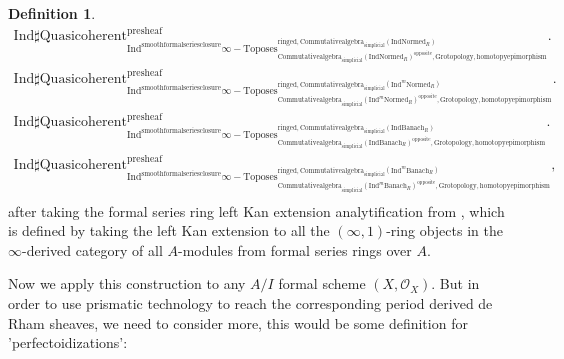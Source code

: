 \documentclass[11pt]{book}
\theoremstyle{definition}
\newtheorem{definition}[theorem]{Definition}
\numberwithin{equation}{section}
\begin{document}
\begin{definition}
\begin{align}
\mathrm{Ind}\mathrm{\sharp Quasicoherent}^{\text{presheaf}}_{\mathrm{Ind}^\text{smoothformalseriesclosure}\infty-\mathrm{Toposes}^{\mathrm{ringed},\mathrm{Commutativealgebra}_{\mathrm{simplicial}}(\mathrm{Ind}\mathrm{Normed}_R)}_{\mathrm{Commutativealgebra}_{\mathrm{simplicial}}(\mathrm{Ind}\mathrm{Normed}_R)^\mathrm{opposite},\mathrm{Grotopology,homotopyepimorphism}}}.\\
\mathrm{Ind}\mathrm{\sharp Quasicoherent}^{\text{presheaf}}_{\mathrm{Ind}^\text{smoothformalseriesclosure}\infty-\mathrm{Toposes}^{\mathrm{ringed},\mathrm{Commutativealgebra}_{\mathrm{simplicial}}(\mathrm{Ind}^m\mathrm{Normed}_R)}_{\mathrm{Commutativealgebra}_{\mathrm{simplicial}}(\mathrm{Ind}^m\mathrm{Normed}_R)^\mathrm{opposite},\mathrm{Grotopology,homotopyepimorphism}}}.\\
\mathrm{Ind}\mathrm{\sharp Quasicoherent}^{\text{presheaf}}_{\mathrm{Ind}^\text{smoothformalseriesclosure}\infty-\mathrm{Toposes}^{\mathrm{ringed},\mathrm{Commutativealgebra}_{\mathrm{simplicial}}(\mathrm{Ind}\mathrm{Banach}_R)}_{\mathrm{Commutativealgebra}_{\mathrm{simplicial}}(\mathrm{Ind}\mathrm{Banach}_R)^\mathrm{opposite},\mathrm{Grotopology,homotopyepimorphism}}}.\\
\mathrm{Ind}\mathrm{\sharp Quasicoherent}^{\text{presheaf}}_{\mathrm{Ind}^\text{smoothformalseriesclosure}\infty-\mathrm{Toposes}^{\mathrm{ringed},\mathrm{Commutativealgebra}_{\mathrm{simplicial}}(\mathrm{Ind}^m\mathrm{Banach}_R)}_{\mathrm{Commutativealgebra}_{\mathrm{simplicial}}(\mathrm{Ind}^m\mathrm{Banach}_R)^\mathrm{opposite},\mathrm{Grotopology,homotopyepimorphism}}},\\ 
\end{align}
after taking the formal series ring left Kan extension analytification from \cite[Section 4.2]{BBM}, which is defined by taking the left Kan extension to all the $(\infty,1)$-ring objects in the $\infty$-derived category of all $A$-modules from formal series rings over $A$.\\
\end{definition}


\noindent Now we apply this construction to any $A/I$ formal scheme $(X,\mathcal{O}_X)$. But in order to use prismatic technology to reach the corresponding period derived de Rham sheaves, we need to consider more, this would be some definition for 'perfectoidizations':
\end{document}
